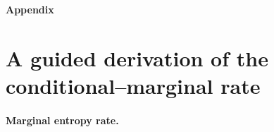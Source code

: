 \documentclass{article}
\theoremstyle{plain}
\theoremstyle{definition}
\theoremstyle{remark}
\begin{document}
%


 




\appendix

\newpage
\begin{center}
{\Large\bfseries Appendix}
\end{center}
\vspace{1em}

\section{A guided derivation of the conditional--marginal rate}
\label{app:full_derivations}

\paragraph{Marginal entropy rate.}
\label{app:marginal_entropy}
\end{document}
